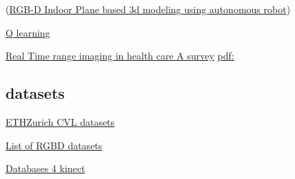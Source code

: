 (\href{https://www.int-arch-photogramm-remote-sens-spatial-inf-sci.net/XL-1/301/2014/isprsarchives-XL-1-301-2014.pdf}{RGB-D Indoor Plane based 3d modeling using autonomous robot})

\href{https://arxiv.org/pdf/1707.03770.pdf}{Q learning}

\href{https://mdanderson.influuent.utsystem.edu/en/publications/real-time-range-imaging-in-health-care-a-survey}{Real Time range imaging in health care A survey}
\href{https://link.springer.com/content/pdf/10.1007\%2F978-3-642-44964-2_11.pdf}{pdf:}

\subsection{datasets}

\href{http://www.vision.ee.ethz.ch/en/datasets/}{ETHZurich CVL datasets}

\href{http://www.michaelfirman.co.uk/RGBDdatasets/}{List of RGBD datasets}

\href{http://www.tlc.dii.univpm.it/blog/databases4kinect}{Databases 4 kinect}
